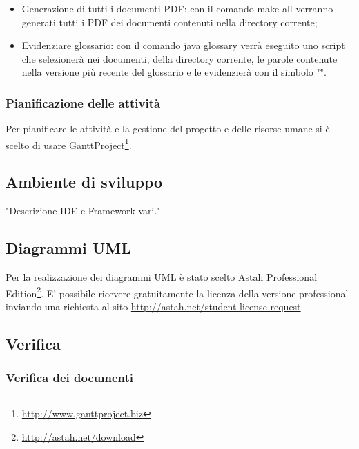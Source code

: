 \begin{itemize}
	\item Generazione di tutti i documenti PDF: con il comando make all verranno generati tutti i PDF dei documenti contenuti nella directory corrente;
	\item Evidenziare glossario: con il comando java glossary verrà eseguito uno script che selezionerà nei documenti, della directory corrente, le parole contenute nella versione più recente del glossario e le evidenzierà con il simbolo "\G".

\end{itemize}

\subsubsection{Pianificazione delle attività}
Per pianificare le attività e la gestione del progetto e delle risorse umane si è scelto di usare GanttProject\footnote{\url{http://www.ganttproject.biz}}.

\subsection{Ambiente di sviluppo}

"Descrizione IDE e Framework vari."

\subsection{Diagrammi UML}

Per la realizzazione dei diagrammi UML è stato scelto Astah Professional Edition\footnote{\url{http://astah.net/download}}.
E' possibile ricevere gratuitamente la licenza della versione professional inviando una richiesta al sito \url{http://astah.net/student-license-request}.

\subsection{Verifica}

\subsubsection{Verifica dei documenti}

